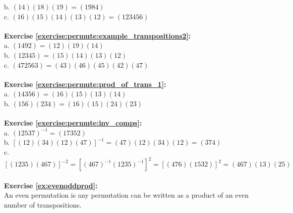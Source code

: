 b. $(14)(18)(19)=(1984)$\\
c. $(16)(15)(14)(13)(12)=(123456)$\\
\\
\textbf{Exercise \ref{exercise:permute:example_transpositions2}:}\\
a. $(1492)=(12)(19)(14)$\\
b. $(12345)=(15)(14)(13)(12)$\\
c. $(472563)=(43)(46)(45)(42)(47)$\\
\\
\textbf{Exercise \ref{exercise:permute:prod_of_trans_1}:}\\
a. $(14356)=(16)(15)(13)(14)$\\
b. $(156)(234)=(16)(15)(24)(23)$\\
\\
\textbf{Exercise \ref{exercise:permute:inv_comps}:}\\
a. $(12537)^{-1}=(17352)$\\
b. $[(12)(34)(12)(47)]^{-1}=(47)(12)(34)(12)=(374)$\\
c. $[(1235)(467)]^{-2}=[(467)^{-1}(1235)^{-1}]^2=[(476)(1532)]^2=(467)(13)(25)$\\
\\
\textbf{Exercise  \ref{ex:evenoddprod}:}\\
An even permutation is any permutation can be written as a product of an even number of transpositions.\\
